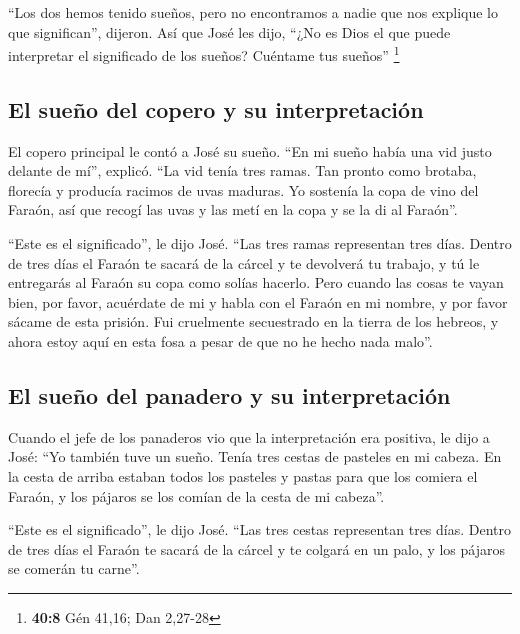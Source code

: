  ``Los dos hemos tenido sueños, pero no encontramos a
nadie que nos explique lo que significan'', dijeron. Así que José les
dijo, ``¿No es Dios el que puede interpretar el significado de los
sueños? Cuéntame tus sueños'' \footnote{\textbf{40:8} Gén 41,16; Dan
  2,27-28}

\hypertarget{el-sueuxf1o-del-copero-y-su-interpretaciuxf3n}{%
\subsection{El sueño del copero y su
interpretación}\label{el-sueuxf1o-del-copero-y-su-interpretaciuxf3n}}

 El copero principal le contó a José su sueño. ``En mi
sueño había una vid justo delante de mí'', explicó.  ``La
vid tenía tres ramas. Tan pronto como brotaba, florecía y producía
racimos de uvas maduras.  Yo sostenía la copa de vino del
Faraón, así que recogí las uvas y las metí en la copa y se la di al
Faraón''.

 ``Este es el significado'', le dijo José. ``Las tres
ramas representan tres días.  Dentro de tres días el
Faraón te sacará de la cárcel y te devolverá tu trabajo, y tú le
entregarás al Faraón su copa como solías hacerlo.  Pero
cuando las cosas te vayan bien, por favor, acuérdate de mi y habla con
el Faraón en mi nombre, y por favor sácame de esta prisión.
 Fui cruelmente secuestrado en la tierra de los hebreos,
y ahora estoy aquí en esta fosa a pesar de que no he hecho nada malo''.

\hypertarget{el-sueuxf1o-del-panadero-y-su-interpretaciuxf3n}{%
\subsection{El sueño del panadero y su
interpretación}\label{el-sueuxf1o-del-panadero-y-su-interpretaciuxf3n}}

 Cuando el jefe de los panaderos vio que la
interpretación era positiva, le dijo a José: ``Yo también tuve un sueño.
Tenía tres cestas de pasteles en mi cabeza.  En la cesta
de arriba estaban todos los pasteles y pastas para que los comiera el
Faraón, y los pájaros se los comían de la cesta de mi cabeza''.

 ``Este es el significado'', le dijo José. ``Las tres
cestas representan tres días.  Dentro de tres días el
Faraón te sacará de la cárcel y te colgará en un palo, y los pájaros se
comerán tu carne''.

